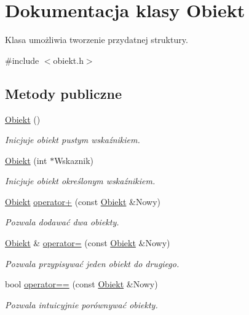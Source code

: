 \hypertarget{class_obiekt}{\section{\-Dokumentacja klasy \-Obiekt}
\label{class_obiekt}
}


\-Klasa umożliwia tworzenie przydatnej struktury.  




{\ttfamily \#include $<$obiekt.\-h$>$}

\subsection*{\-Metody publiczne}
\begin{DoxyCompactItemize}
\item 
\hyperlink{class_obiekt_ac8e27a872226e2b55c6f42c0677e5d00}{\-Obiekt} ()
\begin{DoxyCompactList}\small\item\em \-Inicjuje obiekt pustym wskaźnikiem. \end{DoxyCompactList}\item 
\hyperlink{class_obiekt_a8e2e3537c41235fe165117c3a09b9669}{\-Obiekt} (int $\ast$\-Wskaznik)
\begin{DoxyCompactList}\small\item\em \-Inicjuje obiekt określonym wskaźnikiem. \end{DoxyCompactList}\item 
\hyperlink{class_obiekt}{\-Obiekt} \hyperlink{class_obiekt_ae9b27f251c823ca866ae63479a901a7a}{operator+} (const \hyperlink{class_obiekt}{\-Obiekt} \&\-Nowy)
\begin{DoxyCompactList}\small\item\em \-Pozwala dodawać dwa obiekty. \end{DoxyCompactList}\item 
\hyperlink{class_obiekt}{\-Obiekt} \& \hyperlink{class_obiekt_a75a7336fe08d7ba99ad507371470c33f}{operator=} (const \hyperlink{class_obiekt}{\-Obiekt} \&\-Nowy)
\begin{DoxyCompactList}\small\item\em \-Pozwala przypisywać jeden obiekt do drugiego. \end{DoxyCompactList}\item 
bool \hyperlink{class_obiekt_a1dd7d24ba8cce83355da18a75c89deca}{operator==} (const \hyperlink{class_obiekt}{\-Obiekt} \&\-Nowy)
\begin{DoxyCompactList}\small\item\em \-Pozwala intuicyjnie porównywać obiekty. \end{DoxyCompactList}\item 

\end{DoxyCompactItemize}
